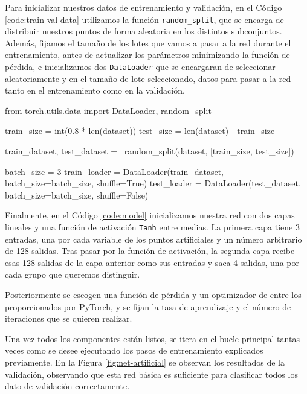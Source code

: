 Para inicializar nuestros datos de entrenamiento y validación, en el Código \ref{code:train-val-data} utilizamos la función \texttt{random\_split}, que se encarga de distribuir nuestros puntos de forma aleatoria en los distintos subconjuntos. Además, fijamos el tamaño de los lotes que vamos a pasar a la red durante el entrenamiento, antes de actualizar los parámetros minimizando la función de pérdida, e inicializamos dos \texttt{DataLoader} que se encargaran de seleccionar aleatoriamente y en el tamaño de lote seleccionado, datos para pasar a la red tanto en el entrenamiento como en la validación.

\begin{mypython}[float={h}, caption={Inicialización de los conjuntos de entrenamiento y validación.}, label={code:train-val-data}]
  from torch.utils.data import DataLoader, random_split

  train_size = int(0.8 * len(dataset))
  test_size = len(dataset) - train_size

  train_dataset, test_dataset = \
  random_split(dataset, [train_size, test_size])

  batch_size = 3
  train_loader = DataLoader(train_dataset,
  batch_size=batch_size,
  shuffle=True)
  test_loader = DataLoader(test_dataset,
  batch_size=batch_size,
  shuffle=False)
\end{mypython}

Finalmente, en el Código \ref{code:model} inicializamos nuestra red con dos capas lineales y una función de activación \texttt{Tanh} entre medias. La primera capa tiene 3 entradas, una por cada variable de los puntos artificiales y un número arbitrario de 128 salidas. Tras pasar por la función de activación, la segunda capa recibe esas 128 salidas de la capa anterior como sus entradas y saca 4 salidas, una por cada grupo que queremos distinguir.

Posteriormente se escogen una función de pérdida y un optimizador de entre los proporcionados por PyTorch, y se fijan la tasa de aprendizaje y el número de iteraciones que se quieren realizar.

Una vez todos los componentes están listos, se itera en el bucle principal tantas veces como se desee ejecutando los pasos de entrenamiento explicados previamente. En la Figura \ref{fig:net-artificial} se observan los resultados de la validación, observando que esta red básica es suficiente para clasificar todos los dato de validación correctamente.

